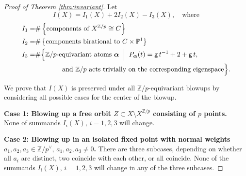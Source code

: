 \documentclass[12pt,a4paper]{amsart}
\theoremstyle{definition}
\theoremstyle{remark}
\newcommand{\Z}{\mathbb{Z}}
\begin{document}
\begin{proof}[Proof of Theorem \ref{thm:invariant}]
Let
$$I(X) = I_1(X)+2I_2(X)-I_3(X),\quad\text{where}$$
\begin{align}
I_1=&\#\left\{ \text{components of } X^{\mathbb{Z}/p} \cong C \right\} \\
I_2=&\#\left\{ \text{components birational to } C \times \mathbb{P}^1 \right\} \\
I_3=& \#\Bigl\{\Z/p\text{-equivariant atoms }\boldsymbol{\alpha} \;\Bigm|\;
       P_{\boldsymbol{\alpha}}(t)=\mathsf{g}\,t^{-1}+2+\mathsf{g}\,t,\\
  &\qquad\qquad\text{and }\Z/p\text{ acts trivially on the corresponding eigenspace}\Bigr\}.
\end{align}

We prove that \( I(X) \) is preserved under all \( \mathbb{Z}/p \)-equivariant blowups by considering all possible cases for the center of the blowup.

\medskip

\noindent\textbf{Case 1: Blowing up a free orbit \( Z \subset X \setminus X^{\mathbb{Z}/p} \) consisting of $p$ points.} \\
None of summands $I_i(X),\,i=1,2,3$ will change.

\medskip
\noindent\textbf{Case 2: Blowing up in an isolated fixed point with normal weights $a_1,a_2,a_3\in \Z/p^\vee,\,a_1,a_2,a_3\ne 0$.}
There are three subcases, depending on whether all $a_i$ are distinct, two coincide with each other, or all coincide. None of the summands $I_i(X),\,i=1,2,3$ will change in any of the three subcases.

\medskip


\end{proof}
\end{document}
